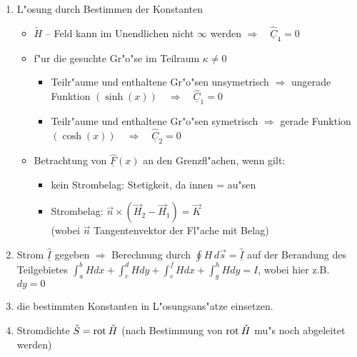 \begin{enumerate}
\begin{itemize}
          {\bf L"osungsansatz:} $\underline{\hat{F}}(x)=\underline{\hat{C}}_3
                      +\underline{\hat{C}}_4 x$
    \end{itemize}
\item L"osung durch Bestimmen der Konstanten
    \begin{itemize}
    \item $\check{H}$ -- Feld kann im Unendlichen nicht $\infty$ werden
          $\Rightarrow\quad \underline{\hat{C}}_4 =0$
    \item f"ur die gesuchte Gr"o"se im Teilraum $\kappa\not=0$
          \begin{itemize}
          \item Teilr"aume und enthaltene Gr"o"sen unsymetrisch $\Rightarrow$
                ungerade Funktion $(\sinh(x))\quad\Rightarrow\quad
                \underline{\hat{C}}_1 =0$
          \item Teilr"aume und enthaltene Gr"o"sen symetrisch $\Rightarrow$
                gerade Funktion $(\cosh(x))\quad\Rightarrow\quad
                \underline{\hat{C}}_2 =0$
          \end{itemize}
    \item Betrachtung von $\underline{\hat{F}}(x)$ an den Grenzfl"achen, wenn
          gilt:
          \begin{itemize}
          \item kein Strombelag: Stetigkeit, da innen = au"sen
          \item Strombelag: $\vec{n}\times(\vec{H}_2-\vec{H}_1)=\vec{K}$\\
                (wobei $\vec{n}$ Tangentenvektor der Fl"ache mit Belag)
          \end{itemize}
    \end{itemize}
\item Strom $\underline{\hat{I}}$ gegeben $\Rightarrow$ Berechnung durch
      $\oint H\, d\vec{s}=\underline{\hat{I}}$ auf der Berandung des
      Teilgebietes $\int_a^bHdx+\int_c^dHdy+\int_e^fHdx+\int_g^hHdy=I$, wobei
      hier z.B.\ $dy=0$
\item die bestimmten Konstanten in L"osungsans"atze einsetzen.
\item Stromdichte $\check{S} = {\rm rot \:}\check{H}$ (nach Bestimmung von
      ${\rm rot \:}\check{H}$ mu"s noch abgeleitet werden)

\end{enumerate}
\clearpage
